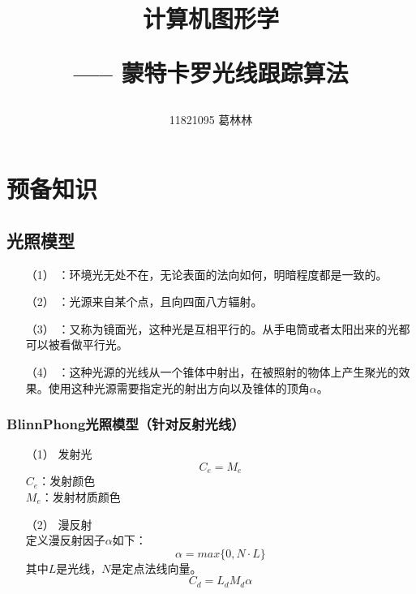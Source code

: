 \documentclass[10pt]{article}
\title{计算机图形学 \hspace{2pt}\hspace{2pt} \begin{large}----- \hspace{2pt} 蒙特卡罗光线跟踪算法 \end{large} }
\author{11821095 葛林林}
\begin{document}
\maketitle
\section{预备知识}
\subsection{光照模型}
\begin{itemize}
\item[（1）]{}：环境光无处不在，无论表面的法向如何，明暗程度都是一致的。
\item[（2）]{}：光源来自某个点，且向四面八方辐射。
\item[（3）]{}：又称为镜面光，这种光是互相平行的。从手电筒或者太阳出来的光都可以被看做平行光。
\item[（4）]{}：这种光源的光线从一个锥体中射出，在被照射的物体上产生聚光的效果。使用这种光源需要指定光的射出方向以及锥体的顶角$\alpha$。
\end{itemize}

\subsubsection{BlinnPhong光照模型（针对反射光线）}
\begin{itemize}
\item[（1）]{发射光} \mbox{}\\
$$C_{e}=M_{e}$$
$C_e$：发射颜色 \\
$M_e$：发射材质颜色

\item[（2）]{漫反射} \mbox{}\\
定义漫反射因子$\alpha$如下：
$$\alpha=max\{0,N \cdot L\}$$
其中$L$是光线，$N$是定点法线向量。
$$C_{d}=L_{d}M_{d}\alpha$$


\end{itemize}
\end{document}
